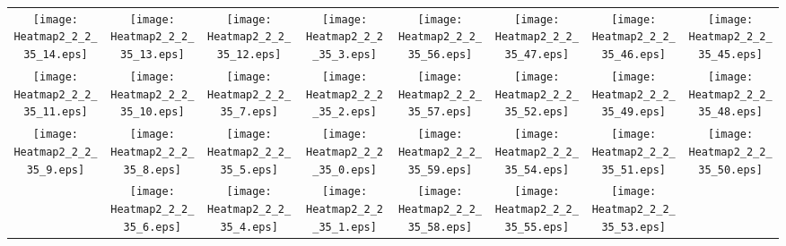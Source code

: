 \documentclass{standalone}
\begin{document}
\begin{tabular}{ *8{c} }
\texttt{[image: Heatmap2\_2\_2\_35\_14.eps]} & \texttt{[image: Heatmap2\_2\_2\_35\_13.eps]} & \texttt{[image: Heatmap2\_2\_2\_35\_12.eps]} & \texttt{[image: Heatmap2\_2\_2\_35\_3.eps]} & \texttt{[image: Heatmap2\_2\_2\_35\_56.eps]} & \texttt{[image: Heatmap2\_2\_2\_35\_47.eps]} & \texttt{[image: Heatmap2\_2\_2\_35\_46.eps]} & \texttt{[image: Heatmap2\_2\_2\_35\_45.eps]} \\
\texttt{[image: Heatmap2\_2\_2\_35\_11.eps]} & \texttt{[image: Heatmap2\_2\_2\_35\_10.eps]} & \texttt{[image: Heatmap2\_2\_2\_35\_7.eps]} & \texttt{[image: Heatmap2\_2\_2\_35\_2.eps]} & \texttt{[image: Heatmap2\_2\_2\_35\_57.eps]} & \texttt{[image: Heatmap2\_2\_2\_35\_52.eps]} & \texttt{[image: Heatmap2\_2\_2\_35\_49.eps]} & \texttt{[image: Heatmap2\_2\_2\_35\_48.eps]} \\
\texttt{[image: Heatmap2\_2\_2\_35\_9.eps]} & \texttt{[image: Heatmap2\_2\_2\_35\_8.eps]} & \texttt{[image: Heatmap2\_2\_2\_35\_5.eps]} & \texttt{[image: Heatmap2\_2\_2\_35\_0.eps]} & \texttt{[image: Heatmap2\_2\_2\_35\_59.eps]} & \texttt{[image: Heatmap2\_2\_2\_35\_54.eps]} & \texttt{[image: Heatmap2\_2\_2\_35\_51.eps]} & \texttt{[image: Heatmap2\_2\_2\_35\_50.eps]} \\
 & \texttt{[image: Heatmap2\_2\_2\_35\_6.eps]} & \texttt{[image: Heatmap2\_2\_2\_35\_4.eps]} & \texttt{[image: Heatmap2\_2\_2\_35\_1.eps]} & \texttt{[image: Heatmap2\_2\_2\_35\_58.eps]} & \texttt{[image: Heatmap2\_2\_2\_35\_55.eps]} & \texttt{[image: Heatmap2\_2\_2\_35\_53.eps]} &  
\end{tabular}
\end{document}
